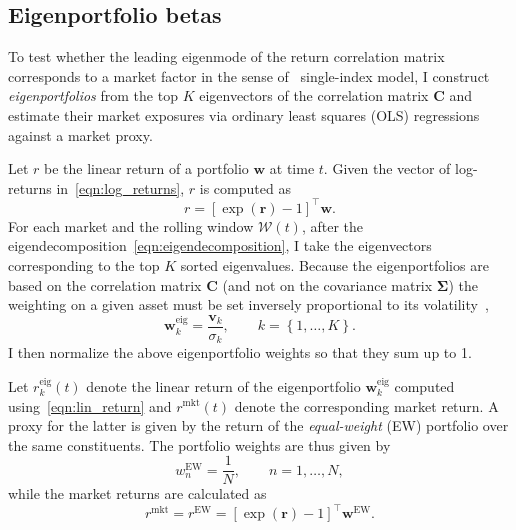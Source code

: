 \documentclass[pdflatex,sn-basic]{sn-jnl}%
\theoremstyle{thmstyleone}%
\theoremstyle{thmstyletwo}%
\theoremstyle{thmstylethree}%
\newcommand{\br}{\boldsymbol{r}}
\newcommand{\bw}{\boldsymbol{w}}
\newcommand{\bv}{\boldsymbol{v}}
\newcommand{\bC}{\boldsymbol{C}}
\newcommand{\bSigma}{\boldsymbol{\Sigma}}
\newcommand{\calW}{\mathcal{W}}
\newcommand{\figbrc}[1]{\left\{ #1 \right\} }
\begin{document}
\subsection{Eigenportfolio betas}
\label{sec:eigenportfolio_betas}

To test whether the leading eigenmode of the return correlation matrix corresponds to a market factor in the sense of~\citet{sharpe1964capital} single-index model, I construct \emph{eigenportfolios} from the top $K$ eigenvectors of the correlation matrix $\bC$ and estimate their market exposures via ordinary least squares (OLS) regressions against a market proxy.

Let $r$ be the linear return of a portfolio $\bw$ at time $t$. Given the vector of log-returns in~\eqref{eqn:log_returns}, $r$ is computed as
\begin{equation}
\label{eqn:lin_return}
    r = [\exp(\br)-1]^{\top} \bw.
\end{equation}
For each market and the rolling window $\calW(t)$, after the eigendecomposition~\eqref{eqn:eigendecomposition}, I take the eigenvectors corresponding to the top $K$ sorted eigenvalues. Because the eigenportfolios are based on the correlation matrix $\bC$ (and not on the covariance matrix $\bSigma$) the weighting on a given asset must be set inversely proportional to its volatility~\citep[see][]{avellaneda2010statistical}, 
\begin{equation}
\label{eqn:eigenportfolio}
    \bw^{\textrm{eig}}_k = \frac{\bv_k}{\sigma_k}, \qquad k = \figbrc{1, \ldots,K}.
\end{equation}
I then normalize the above eigenportfolio weights so that they sum up to 1. 

Let $r^{\textrm{eig}}_k(t)$ denote the linear return of the eigenportfolio $\bw^{\textrm{eig}}_k$ computed using~\eqref{eqn:lin_return} and $r^{\textrm{mkt}}(t)$ denote the corresponding market return. A proxy for the latter is given by the return of the \textit{equal-weight} (EW) portfolio over the same constituents. The portfolio weights are thus given by
\begin{equation}
\label{eqn:ew_portfolio}
    w^{\textrm{EW}}_n = \frac{1}{N}, \qquad n = 1,\dots,N,
\end{equation}
while the market returns are calculated as
\begin{equation}
\label{eqn:market_return}
    r^{\textrm{mkt}} = r^{\textrm{EW}} = [\exp(\br)-1]^{\top} \bw^{\textrm{EW}}.
\end{equation}
\end{document}
